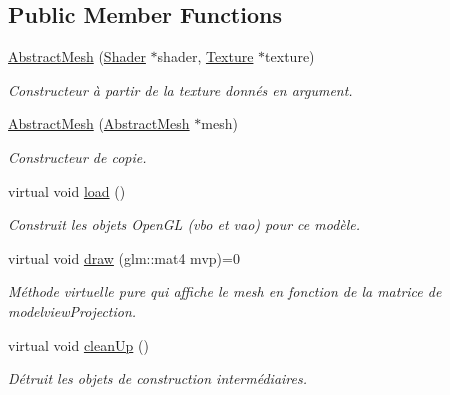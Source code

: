 \subsection*{Public Member Functions}
\begin{DoxyCompactItemize}
\item 
\hypertarget{classAbstractMesh_ade7bd3d65928c4676be31263bafc8a71}{\hyperlink{classAbstractMesh_ade7bd3d65928c4676be31263bafc8a71}{Abstract\+Mesh} (\hyperlink{classShader}{Shader} $\ast$shader, \hyperlink{classTexture}{Texture} $\ast$texture)}\label{classAbstractMesh_ade7bd3d65928c4676be31263bafc8a71}

\begin{DoxyCompactList}\small\item\em Constructeur à partir de la texture donnés en argument. \end{DoxyCompactList}\item 
\hypertarget{classAbstractMesh_a6a2a3bd0e2e321707ec7fef7ff933ba6}{\hyperlink{classAbstractMesh_a6a2a3bd0e2e321707ec7fef7ff933ba6}{Abstract\+Mesh} (\hyperlink{classAbstractMesh}{Abstract\+Mesh} $\ast$mesh)}\label{classAbstractMesh_a6a2a3bd0e2e321707ec7fef7ff933ba6}

\begin{DoxyCompactList}\small\item\em Constructeur de copie. \end{DoxyCompactList}\item 
\hypertarget{classAbstractMesh_a9688f69d4431eb08c7b65693d0fffd9e}{virtual void \hyperlink{classAbstractMesh_a9688f69d4431eb08c7b65693d0fffd9e}{load} ()}\label{classAbstractMesh_a9688f69d4431eb08c7b65693d0fffd9e}

\begin{DoxyCompactList}\small\item\em Construit les objets Open\+G\+L (vbo et vao) pour ce modèle. \end{DoxyCompactList}\item 
\hypertarget{classAbstractMesh_aef065877afe59562920748e265196c82}{virtual void \hyperlink{classAbstractMesh_aef065877afe59562920748e265196c82}{draw} (glm\+::mat4 mvp)=0}\label{classAbstractMesh_aef065877afe59562920748e265196c82}

\begin{DoxyCompactList}\small\item\em Méthode virtuelle pure qui affiche le mesh en fonction de la matrice de modelview\+Projection. \end{DoxyCompactList}\item 
\hypertarget{classAbstractMesh_a996ae58b3352c31f834a07ab0b071d6c}{virtual void \hyperlink{classAbstractMesh_a996ae58b3352c31f834a07ab0b071d6c}{clean\+Up} ()}\label{classAbstractMesh_a996ae58b3352c31f834a07ab0b071d6c}

\begin{DoxyCompactList}\small\item\em Détruit les objets de construction intermédiaires. \end{DoxyCompactList}\end{DoxyCompactItemize}
